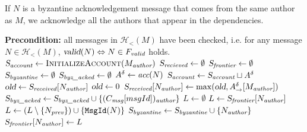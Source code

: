 \documentclass{article}
\begin{document}
If $N$ is a byzantine acknowledgement message that comes from the same author as $M$, we acknowledge all the authors that appear in the dependencies.
\begin{algorithm}[ht]
    \caption{Function that creates summary based on a message}
    \label{alg:create-summary}
\begin{algorithmic}[1]
    \Statex \textbf{Precondition:} all messages in $\mathcal H_<(M)$ have been checked, i.e. for any message $N \in \mathcal H_<(M)$, $\textsl{valid}(N) \Leftrightarrow N \in F_\emph{valid}$ holds.
    \State $\var{S}_\emph{account} \gets \Call{InitializeAccount}{M_\emph{author}}$
    \State $\textsl{S}_\emph{recieved} \gets \emptyset$ 
    \State $\textsl{S}_\emph{frontier} \gets \emptyset$ 
    \State $\textsl{S}_\emph{byzantine} \gets \emptyset$
    \State $\textsl{S}_\emph{byz\_acked} \gets \emptyset$
                \State $A^\delta \gets \textit{acc}(N)$
                    \State $\textsl{S}_\emph{account} \gets \textsl{S}_\emph{account} \sqcup A^\delta$
                \Else
                            \State $\textsl{old} \gets \textsl{S}_\emph{received}[N_\emph{author}]$
                        \Else
                            \State $\textsl{old} \gets 0$
                        \EndIf
                        \State $\textsl{S}_\emph{received}[N_\emph{author}] \gets \max(\textsl{old}, A^\delta_\rightarrow[M_\emph{author}])$
                    \EndIf
                \EndIf
            \Else {}
                        \State $\textsl{S}_\emph{byz\_acked} \gets \textsl{S}_\emph{byz\_acked} \cup \{(C_\emph{msg}[msgId])_\emph{author}\}$
                    \EndFor
                \EndIf
            \EndIf
        \EndIf
        \State $L \gets \emptyset$ \label{alg:create-summary:frontier}
            \State $L \gets \textsl{S}_\emph{frontier}[N_\emph{author}]$
        \EndIf
        \State $L \gets (L \setminus \{N_\emph{prev}\}) \cup \{\texttt{MsgId}(N)\}$
            \State $\textsl{S}_\emph{byzantine} \gets \textsl{S}_\emph{byzantine} \cup \{N_\emph{author}\}$
        \EndIf
        \State $\textsl{S}_\emph{frontier}[N_\emph{author}] \gets L$
    \EndFor
    \State \Return {}


\end{algorithmic}
\end{algorithm}
\end{document}
